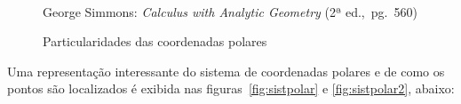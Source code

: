 \begin{figure}[H]
  \begin{center}
    \caption{Particularidades das coordenadas polares}
    \label{fig:caracteristicaspolar}
    \\
    \footnotesize{George Simmons: \emph{Calculus with Analytic
            Geometry} (2ª ed.,\ pg.\ 560)}
  \end{center}
\end{figure}

Uma representação interessante do sistema de coordenadas polares e de
como os pontos são localizados é
exibida nas figuras~\ref{fig:sistpolar} e \ref{fig:sistpolar2}, abaixo:

